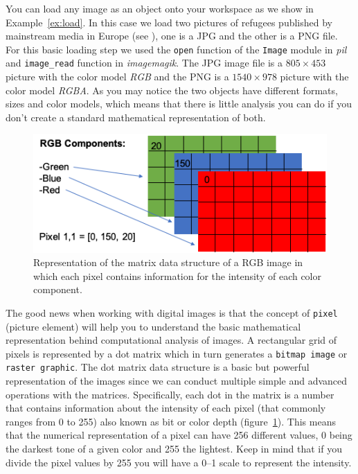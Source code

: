 You can load any image as an object onto your workspace as we show in Example~\ref{ex:load}. In this case we load two pictures of refugees published by mainstream media in Europe (see \citet{amores2019visual}), one is a JPG and the other is a PNG file. For this basic loading step we used the \texttt{open} function of the \texttt{Image} module in \emph{pil} and \texttt{image\_read} function in \emph{imagemagik}. The JPG image file is a $805\times 453$ picture with the color model \textit{RGB} and the PNG is a $1540\times 978$ picture with the color model \textit{RGBA}. As you may notice the two objects have different formats, sizes and color models, which means that there is little analysis you can do if you don't create a standard mathematical representation of both.


\begin{figure}
\centering
\includegraphics[width=0.9\linewidth]{figures/ch15_pixel.png}
\caption{Representation of the matrix data structure of a RGB image in which each pixel contains information for the intensity of each color component.}
\label{fig:pixel}
\end{figure}

The good news when working with digital images is that the concept of \texttt{pixel} (picture element) will help you to understand the basic mathematical representation behind computational analysis of images. A rectangular grid of pixels is represented by a dot matrix which in turn generates a \texttt{bitmap image} or \texttt{raster graphic}. The dot matrix data structure is a basic but powerful representation of the images since we can conduct multiple simple and advanced operations with the matrices. Specifically, each dot in the matrix is a number that contains information about the intensity of each pixel (that commonly ranges from 0 to 255) also known as bit or color depth (figure~\ref{fig:pixel}). This means that the numerical representation of a pixel can have 256 different values, 0 being the darkest tone of a given color and 255 the lightest. Keep in mind that if you divide the pixel values by 255 you will have a 0--1 scale to represent the intensity.

